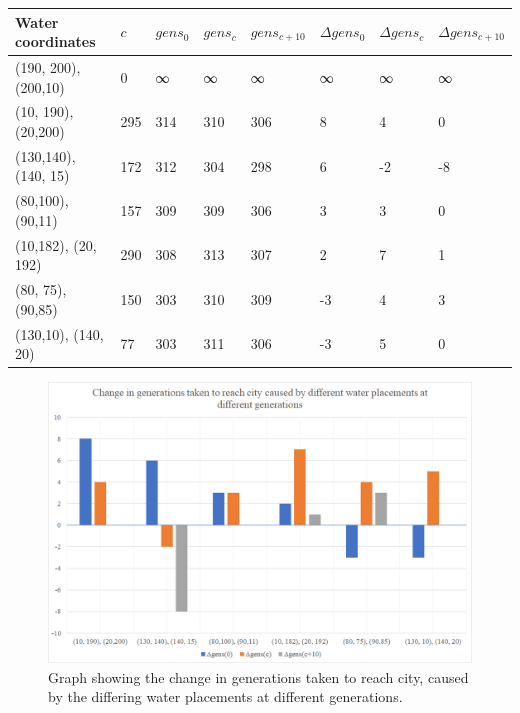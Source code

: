 \documentclass[11pt, a4paper, titlepage]{article}
\begin{document}
      \begin{table}[H]
        \begin{tabular}{|l|l|l|l|l|l|l|l|}
        \hline
        Water coordinates    &  $c$ & $gens_0$ & $gens_{c}$ & $gens_{c+10}$ & $\Delta gens_0$ & $\Delta gens_c$ & $\Delta gens_{c+10}$ \\ \hline
        (190, 200), (200,10) & 0   & ∞     & ∞       & ∞         & ∞        & ∞        & ∞           \\ \hline
        (10, 190), (20,200)  & 295 & 314   & 310     & 306       & 8        & 4        & 0           \\ \hline
        (130,140), (140, 15) & 172 & 312   & 304     & 298       & 6        & -2       & -8          \\ \hline
        (80,100),(90,11)     & 157 & 309   & 309     & 306       & 3        & 3        & 0           \\ \hline
        (10,182), (20, 192)  & 290 & 308   & 313     & 307       & 2        & 7        & 1           \\ \hline
        (80, 75), (90,85)    & 150 & 303   & 310     & 309       & -3       & 4        & 3           \\ \hline
        (130,10), (140, 20)  & 77  & 303   & 311     & 306       & -3       & 5        & 0           \\ \hline
        \end{tabular}
        \end{table}

        \begin{figure}[h]
          \centering
            \includegraphics[width=\linewidth]{imgs/graphs/water_gens.png}
          \caption{Graph showing the change in generations taken to reach city, caused by the differing water placements at different generations.}
          \label{}
        \end{figure}
\end{document}
